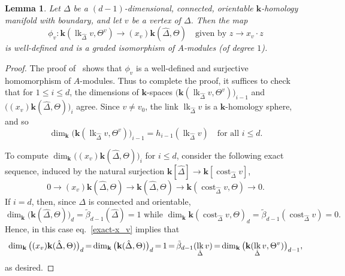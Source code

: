 \documentclass[10pt]{amsart}
\newtheorem{lemma}[theorem]{Lemma}
\theoremstyle{definition}
\DeclareMathOperator\lk{lk}
\DeclareMathOperator\cost{cost}
\newcommand{\complet}[1]{\hat{#1}}
\newcommand{\field}{\mathbf{k}}
\newcommand*{\Mk}{\mkern -2mu}
\begin{document}
\begin{lemma} \label{analog-of-Prop4.24}
 Let $\Delta$ be a $(d-1)$-dimensional, connected, orientable $\field$-homology manifold with boundary, and let $v$ be a vertex of $\Delta$. Then 
the map
\[\phi_v: \field(\lk_{\complet{\Delta}}v, \Theta^v) \to (x_v)\field(\complet{\Delta},\Theta) \quad \mbox{given by } z \to x_v\cdot z
\]
is well-defined and is a graded isomorphism of $A$-modules (of degree $1$).
\end{lemma}
\begin{proof} The proof of~\cite[Proposition~4.24]{Swartz-09} shows that $\phi_v$ is a well-defined and surjective homomorphism of $A$-modules. Thus to complete the proof, it suffices to check that for $1\leq i\leq d$, the dimensions of $\field$-spaces $\big(\field(\lk_{\complet{\Delta}}v, \Theta^v)\big)_{i-1}$ and $\big((x_v)\field(\complet{\Delta},\Theta)\big)_i$ agree.
Since $v\neq v_0$, the link $\lk_{\complet{\Delta}}v$ is a $\field$-homology sphere, and so 
\begin{equation} \label{dim-lk}
\dim_\field \big(\field(\lk_{\complet{\Delta}}v, \Theta^v)\big)_{i-1}=h_{i-1}(\lk_{\complet{\Delta}}v) \quad \mbox{for all }i\leq d.
\end{equation}

To compute $\dim_\field \big((x_v)\field(\complet{\Delta},\Theta)\big)_i$ for $i\leq d$, consider the following exact sequence, induced by the natural surjection $\field[\complet{\Delta}]\to \field[\cost_{\complet{\Delta}}v]$, 
\begin{equation} \label{exact-x_v}
0\to (x_v)\field(\complet{\Delta},\Theta) \to \field(\complet{\Delta},\Theta) \to \field(\cost_{\complet{\Delta}}v, \Theta)\to 0.
\end{equation}
If $i=d$, then, since $\Delta$ is connected and orientable, 
\[
\dim_\field \big(\field(\complet{\Delta},\Theta)\big)_d=\tilde{\beta}_{d-1}(\complet{\Delta})=1 \mbox{ while } \dim_\field \field(\cost_{\complet{\Delta}}v, \Theta)_d=\tilde{\beta}_{d-1}(\cost_{\complet{\Delta}}v)=0.
\] 
Hence, in this case eq.~\eqref{exact-x_v} implies that
\[
\dim_\field \big((x_v)\field(\complet{\Delta},\Theta)\big)_d \Mk =\Mk \dim_\field \big(\field(\complet{\Delta},\Theta)\big)_d\Mk =\Mk 1
\Mk =\Mk \tilde{\beta}_{d-1}(\lk_{\complet{\Delta}}v)\Mk =\Mk \dim_\field \big(\field(\lk_{\complet{\Delta}}v, \Theta^v)\big)_{d-1},
\]
as desired. 


\end{proof}
\end{document}
